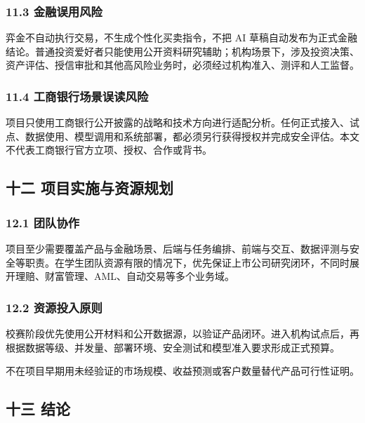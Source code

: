 \documentclass[a4paper,12pt,fontset=none]{ctexart}
\begin{document}
\subsubsection{11.3
金融误用风险}\label{ux91d1ux878dux8befux7528ux98ceux9669}

弈金不自动执行交易，不生成个性化买卖指令，不把 AI
草稿自动发布为正式金融结论。普通投资爱好者只能使用公开资料研究辅助；机构场景下，涉及投资决策、资产评估、授信审批和其他高风险业务时，必须经过机构准入、测评和人工监督。

\subsubsection{11.4
工商银行场景误读风险}\label{ux5de5ux5546ux94f6ux884cux573aux666fux8befux8bfbux98ceux9669}

项目只使用工商银行公开披露的战略和技术方向进行适配分析。任何正式接入、试点、数据使用、模型调用和系统部署，都必须另行获得授权并完成安全评估。本文不代表工商银行官方立项、授权、合作或背书。

\subsection{十二
项目实施与资源规划}\label{ux5341ux4e8c-ux9879ux76eeux5b9eux65bdux4e0eux8d44ux6e90ux89c4ux5212}

\subsubsection{12.1 团队协作}\label{ux56e2ux961fux534fux4f5c}

项目至少需要覆盖产品与金融场景、后端与任务编排、前端与交互、数据评测与安全等职责。在学生团队资源有限的情况下，优先保证上市公司研究闭环，不同时展开理赔、财富管理、AML、自动交易等多个业务域。

\subsubsection{12.2
资源投入原则}\label{ux8d44ux6e90ux6295ux5165ux539fux5219}

校赛阶段优先使用公开材料和公开数据源，以验证产品闭环。进入机构试点后，再根据数据等级、并发量、部署环境、安全测试和模型准入要求形成正式预算。

不在项目早期用未经验证的市场规模、收益预测或客户数量替代产品可行性证明。

\subsection{十三 结论}\label{ux5341ux4e09-ux7ed3ux8bba}
\end{document}
